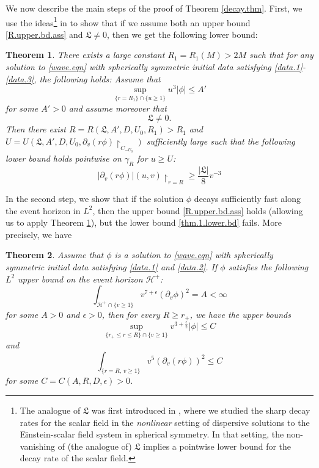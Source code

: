 \documentclass[12 pt, reqno]{amsart}
\newtheorem{theorem}{Theorem}[section]
\theoremstyle{definition}
\theoremstyle{remark}
\numberwithin{equation}{section}
\newcommand{\ep}{\epsilon}
\newcommand{\rd}{\partial}
\newcommand{\0}{\emptyset}
\newcommand{\f}{\frac}
\begin{document}
We now describe the main steps of the proof of Theorem \ref{decay.thm}. First, we use the ideas\footnote{The analogue of $\mathfrak{L}$ was first introduced in \cite{LO1}, where we studied the sharp decay rates for the scalar field in the \emph{nonlinear} setting of dispersive solutions to the Einstein-scalar field system in spherical symmetry. In that setting, the non-vanishing of (the analogue of) $\mathfrak{L}$ implies a pointwise lower bound for the decay rate of the scalar field. } in \cite{LO1} to show that if we assume both an upper bound \eqref{R.upper.bd.ass} and $\mathfrak L\neq 0$, then we get the following lower bound:
\begin{theorem}\label{thm.decay.R}
There exists a large constant $R_1=R_1(M)>2M$ such that for any solution to \eqref{wave.eqn} with spherically symmetric initial data satisfying \eqref{data.1}-\eqref{data.3}, the following holds:
Assume that
\begin{equation}\label{R.upper.bd.ass}
\sup_{\{r= R_1\}\cap\{u\geq 1\}} u^3|\phi|\leq A'
\end{equation}
for some $A'>0$ and assume moreover that 
$$\mathfrak L\neq 0.$$
Then there exist $R=R(\mathfrak L,A',D,U_0,R_1)>R_1$ and $U=U(\mathfrak L,A',D,U_0,\rd_v(r\phi)\restriction_{C_{-U_{0}}})$ sufficiently large such that the following lower bound holds pointwise on $\gamma_R$ for $u \geq U$:
\begin{equation}\label{thm.1.lower.bd}
|\rd_v(r\phi)|(u,v)\restriction_{r=R}\geq \f{|\mathfrak L|}{8}v^{-3}
\end{equation}
\end{theorem}
In the second step, we show that if the solution $\phi$ decays sufficiently fast along the event horizon in $L^2$, then the upper bound \eqref{R.upper.bd.ass} holds (allowing us to apply Theorem \ref{thm.decay.R}), but the lower bound \eqref{thm.1.lower.bd} fails. More precisely, we have
\begin{theorem}\label{horizon.lower.bd}
Assume that $\phi$ is a solution to \eqref{wave.eqn} with spherically symmetric initial data satisfying \eqref{data.1} and \eqref{data.2}. If $\phi$ satisfies the following $L^2$ upper bound on the event horizon $\mathcal H^+$:
$$\int_{\mathcal H^+\cap \{v\geq 1\}} v^{7+\ep}(\rd_v\phi)^2 =A<\infty$$
for some $A>0$ and $\ep>0$, then for every $R\geq r_+$, we have the upper bounds
$$\sup_{\{r_+\leq r\leq R\}\cap\{v\geq 1\}} v^{3+\f \ep 2}|\phi|\leq C$$
and 
$$\int_{\{r=R,\, v\geq 1\}} v^{5}(\rd_v(r\phi))^2\leq C $$
for some $C=C(A,R,D,\ep)>0$.
\end{theorem}
\end{document}

